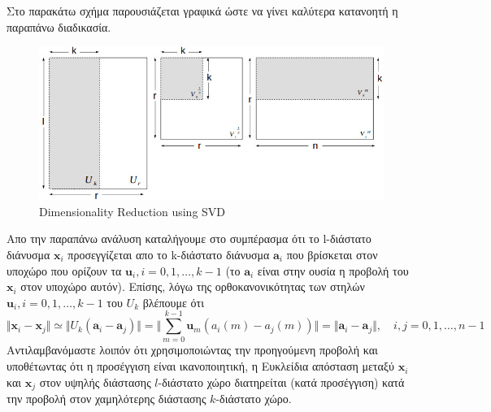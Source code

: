 \par
Στο παρακάτω σχήμα παρουσιάζεται γραφικά ώστε να γίνει καλύτερα κατανοητή η παραπάνω διαδικασία. \\
\vspace*{6cm}
\begin{figure}[h]
\centering
\includegraphics[scale=0.7]{figs/1.jpg}
\newline
\caption{\textlatin{Dimensionality Reduction using SVD}} 
\end{figure}
\par
\vspace*{2cm}
Απο την παραπάνω ανάλυση καταλήγουμε στο συμπέρασμα ότι το \textlatin{l}-διάστατο διάνυσμα $ \mathbf{x}_{i} $ προσεγγίζεται απο το \textlatin{k}-διάστατο διάνυσμα $ \mathbf{a}_{i} $ που βρίσκεται στον υποχώρο που ορίζουν τα $ \mathbf{u}_{i},i=0,1,\ldots,k-1$ (το $ \mathbf{a}_{i}$ είναι στην ουσία η προβολή του $ \mathbf{x}_{i} $ στον υποχώρο αυτόν). Επίσης, λόγω της ορθοκανονικότητας των στηλών $ \mathbf{u}_{i},i=0,1,\ldots,k-1 $ του $ U_{k} $ βλέπουμε ότι
\newline\hspace*{\fill}
\begin{equation}
	\Vert \mathbf{x}_{i}-\mathbf{x}_{j} \Vert \simeq \Vert U_{k}(\mathbf{a}_{i}-\mathbf{a}_{j}) \Vert = \Vert \sum_{m=0}^{k-1} \mathbf{u}_{m} (a_{i}(m)-a_{j}(m)) \Vert = \Vert \mathbf{a}_{i}-\mathbf{a}_{j}\Vert, \quad i,j=0,1,\ldots,n-1
\end{equation}
\hspace*{\fill}\newline
Αντιλαμβανόμαστε λοιπόν ότι χρησιμοποιώντας την προηγούμενη προβολή και υποθέτωντας ότι η προσέγγιση είναι ικανοποιητική, η Ευκλείδια απόσταση μεταξύ $ \mathbf{x}_{i} $ και $ \mathbf{x}_{j} $ στον υψηλής διάστασης $l$-διάστατο χώρο διατηρείται (κατά προσέγγιση) κατά την προβολή στον χαμηλότερης διάστασης $k$-διάστατο χώρο.
